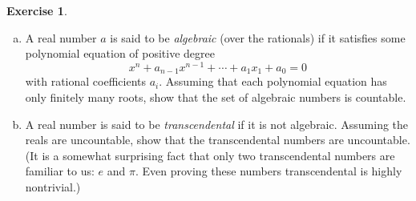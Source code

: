\documentclass[11pt,a4paper,twoside]{article}
\theoremstyle{definition}
\newcounter{excounter}
\newtheorem{exercise}[excounter]{Exercise}
\begin{document}
\begin{exercise}\hfill

  \begin{enumerate}[(a)]

  \item A real number $a$ is said to be \emph{algebraic} (over the rationals) if it satisfies some polynomial equation of positive degree
    \begin{equation*}
      x^n + a_{n - 1} x^{n - 1} + \dotsb + a_1 x_1 + a_0 = 0
    \end{equation*}
    with rational coefficients $a_i$. Assuming that each polynomial equation has only finitely many roots,
    show that the set of algebraic numbers is countable.

  \item A real number is said to be \emph{transcendental} if it is not algebraic. Assuming the reals are uncountable,
    show that the transcendental numbers are uncountable. (It is a somewhat surprising fact that only two transcendental numbers
    are familiar to us: $e$ and $\pi$. Even proving these numbers transcendental is highly nontrivial.)

  \end{enumerate}

\end{exercise}
\end{document}
